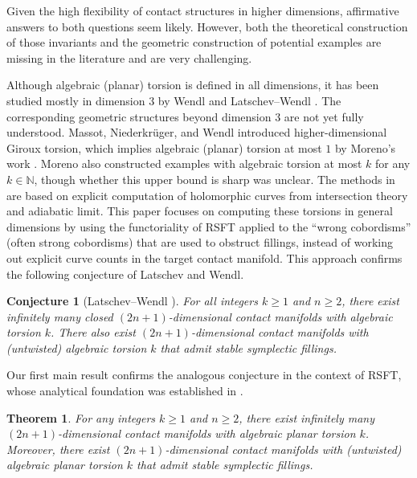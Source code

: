 \documentclass[11pt]{amsart}
\numberwithin{equation}{section}
\newtheorem{thmx}{Theorem}
\newtheorem{conj}[theorem]{\textbf{Conjecture}}
\begin{document}
Given the high flexibility of contact structures in higher dimensions, affirmative answers to both questions seem likely. However, both the theoretical construction of those invariants and the geometric construction of potential examples are missing in the literature and are very challenging.

Although algebraic (planar) torsion is defined in all dimensions, it has been studied mostly in dimension $3$ by Wendl \cite{zbMATH06218377} and Latschev--Wendl \cite{LW}. The corresponding geometric structures beyond dimension $3$ are not yet fully understood. Massot, Niederkr{\"u}ger, and Wendl \cite{MNW} introduced higher-dimensional Giroux torsion, which implies algebraic (planar) torsion at most $1$ by Moreno's work \cite{moreno2019algebraic}. Moreno \cite{moreno2019algebraic} also constructed examples with algebraic torsion at most $k$ for any $k \in \mathbb{N}$, though whether this upper bound is sharp was unclear. The methods in \cite{LW,moreno2019algebraic} are based on explicit computation of holomorphic curves from intersection theory and adiabatic limit. This paper focuses on computing these torsions in general dimensions by using the functoriality of RSFT applied to the ``wrong cobordisms'' (often strong cobordisms) that are used to obstruct fillings, instead of working out explicit curve counts in the target contact manifold. This approach confirms the following conjecture of Latschev and Wendl.

\begin{conj}[Latschev--Wendl {\cite[\S 5]{LW}}]
    For all integers $k \ge 1$ and $n \ge 2$, there exist infinitely many closed $(2n+1)$-dimensional contact manifolds with algebraic torsion $k$. There also exist $(2n+1)$-dimensional contact manifolds with (untwisted) algebraic torsion $k$ that admit stable symplectic fillings.
\end{conj}

Our first main result confirms the analogous conjecture in the context of RSFT, whose analytical foundation was established in \cite{moreno2024landscape}.

\begin{thmx}\label{thm:finite_APT}
    For any integers $k \ge 1$ and $n \ge 2$, there exist infinitely many $(2n+1)$-dimensional contact manifolds with algebraic planar torsion $k$. Moreover, there exist $(2n+1)$-dimensional contact manifolds with (untwisted) algebraic planar torsion $k$ that admit stable symplectic fillings.
\end{thmx}
\end{document}

